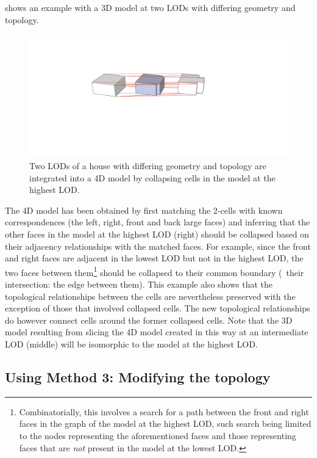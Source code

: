  shows an example with a 3D model at two LODs with differing geometry and topology.
\begin{figure}[tb]
   \centering
   \includegraphics[width=\linewidth]{figs/shape}
   \caption[Linking by collapsing]{Two LODs of a house with differing geometry and topology are integrated into a 4D model by collapsing cells in the model at the highest LOD.}
\label{fig:shape}
\end{figure}
The 4D model has been obtained by first matching the 2-cells with known correspondences (the left, right, front and back large faces) and inferring that the other faces in the model at the highest LOD (right) should be collapsed based on their adjacency relationships with the matched faces.
For example, since the front and right faces are adjacent in the lowest LOD but not in the highest LOD, the two faces between them\footnote{Combinatorially, this involves a search for a path between the front and right faces in the graph of the model at the highest LOD, such search being limited to the nodes representing the aforementioned faces and those representing faces that are \emph{not} present in the model at the lowest LOD.} should be collapsed to their common boundary (\ie\ their intersection: the edge between them).
This example also shows that the topological relationships between the cells are nevertheless preserved with the exception of those that involved collapsed cells.
The new topological relationships do however connect cells around the former collapsed cells.
Note that the 3D model resulting from slicing the 4D model created in this way at an intermediate LOD (middle) will be isomorphic to the model at the highest LOD.\@


\subsection{Using Method 3: Modifying the topology}

